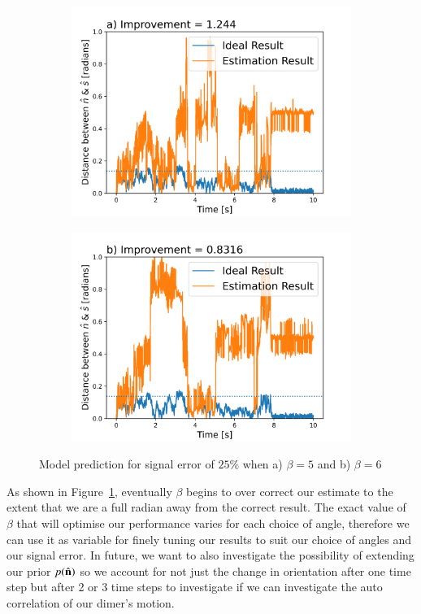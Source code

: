 \documentclass[final, 3p]{elsarticle}
\begin{document}
\begin{figure}[h]
	\centering
	\begin{subfigure}{0.33\textwidth}
		\includegraphics[width=\textwidth]{./Images/Beta_2.png}
	\end{subfigure}
	\begin{subfigure}{0.33\textwidth}
		\includegraphics[width=\textwidth]{./Images/Beta_3.png}
	\end{subfigure}
	\caption{Model prediction for signal error of $25\%$ when a) $\beta = 5$ and b) $\beta=6$}
	\label{fig:beta}
\end{figure}

As shown in Figure~\ref{fig:beta}, eventually $\beta$ begins to over
correct our estimate to the extent that we are a full radian away from
the correct result.  The exact value of $\beta$ that will optimise our
performance varies for each choice of angle, therefore we can use it
as variable for finely tuning our results to suit our choice of angles
and our signal error.  In future, we want to also investigate the
possibility of extending our prior $p(\hat{\bf n})$ so we account for not
just the change in orientation after one time step but after 2 or 3
time steps to investigate if we can investigate the auto correlation
of our dimer's motion.
\end{document}

